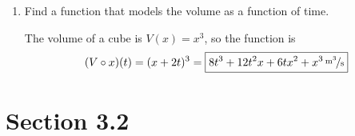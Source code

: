 \documentclass{exam}
\begin{document}
\begin{enumerate}
\begin{enumerate}[a]
        \item Find a function that models the volume as a function of time.
          \begin{solution}
              The volume of a cube is $V(x) = x^3$, so the function is 
              \[
                (V \circ x)(t) = (x + 2t)^3 = \boxed{\unitfrac[8t^3 + 12t^2x + 6tx^2 + x^3]{m^3}{s}}
              \]
          \end{solution}

      \end{enumerate}

  \end{enumerate}

  \ifprintanswers

  \pagebreak

    \section{Section 3.2}
\end{document}
